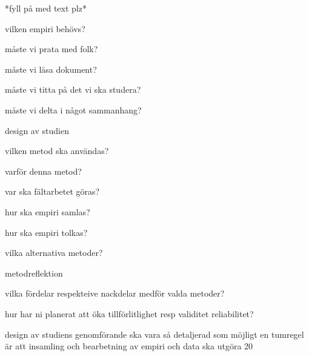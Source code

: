 *fyll på med text plz*

vilken empiri behövs?

måste vi prata med folk?

måste vi läsa dokument?

måste vi titta på det vi ska studera?

måste vi delta i något sammanhang?

design av studien

vilken metod ska användas?

varför denna metod?

var ska fältarbetet göras?

hur ska empiri samlas?

hur ska empiri tolkas?

vilka alternativa metoder?

metodreflektion

vilka fördelar respekteive nackdelar medför valda metoder?

hur har ni planerat att öka tillförlitlighet resp validitet reliabilitet?

design av studiens genomförande ska vara så detaljerad som möjligt
en tumregel är att insamling och bearbetning av empiri och data ska utgöra 20%
